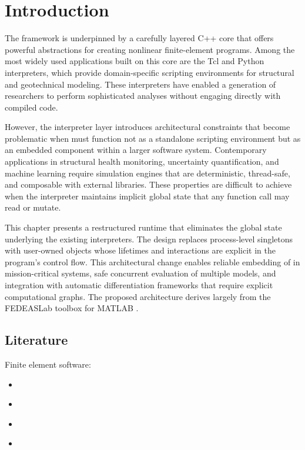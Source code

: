 

\section{Introduction}

The \OpenSees{} framework \citep{mckenna1997object} is underpinned by a carefully layered C++ core that offers powerful abstractions for creating nonlinear finite-element programs. 
Among the most widely used applications built on this core are the Tcl and Python interpreters, which provide domain-specific scripting environments for structural and geotechnical modeling. 
These interpreters have enabled a generation of researchers to perform sophisticated analyses without engaging directly with compiled code.

However, the interpreter layer introduces architectural constraints that become problematic when \OpenSees{} must function not as a standalone scripting environment but as an embedded component within a larger software system. 
Contemporary applications in structural health monitoring, uncertainty quantification, and machine learning require simulation engines that are deterministic, thread-safe, and composable with external libraries.
These properties are difficult to achieve when the interpreter maintains implicit global state that any function call may read or mutate. 

This chapter presents a restructured runtime that eliminates the global state underlying the existing interpreters. 
The design replaces process-level singletons with user-owned objects whose lifetimes and interactions are explicit in the program's control flow. 
This architectural change enables reliable embedding of \OpenSees{} in mission-critical systems, safe concurrent evaluation of multiple models, and integration with automatic differentiation frameworks that require explicit computational graphs. 
The proposed architecture derives largely from the FEDEASLab toolbox for MATLAB \citep{filippou2004fedeaslab}. 

\subsection{Literature}
Finite element software:
\begin{itemize}
    \item \cite{taylor1970finite}
    \item \cite{wilson1970sap}
    \item \citep{mckenna1997object}
    \item \citep{zhu2018openseespy}
\end{itemize}


